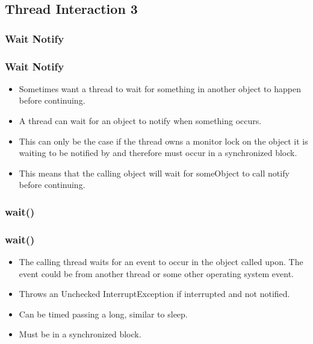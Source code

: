 \documentclass{beamer}
\begin{document}
\subsection{Thread Interaction 3}
\subsubsection{Wait Notify}
\begin{frame}
\frametitle{Wait Notify}
\begin{itemize}
\item Sometimes want a {\color{orange}thread} to {\color{green}wait} for something in another object to happen before continuing.
\item A {\color{orange} thread} can wait for an object to {\color{red} notify} when something occurs. 
\item This can only be the case if the {\color{orange} thread} owns a {\color{purple} monitor lock} on the object it is waiting to be notified by and therefore must occur in a {\color{magenta} synchronized} block.
\waitNotify
\item This means that the calling object will wait for someObject to call {\color{red} notify} before continuing.
\end{itemize}
\end{frame}

\subsubsection{wait()}
\begin{frame}
\frametitle{wait()}
\begin{itemize}
\item The calling thread waits for an event to occur in the object called upon. The event could be from another thread or some other operating system event.
\item Throws an Unchecked InterruptException if interrupted and not notified.
\item Can be timed passing a long, similar to sleep.
\item Must be in a synchronized block.
\end{itemize}
\end{frame}
\end{document}
